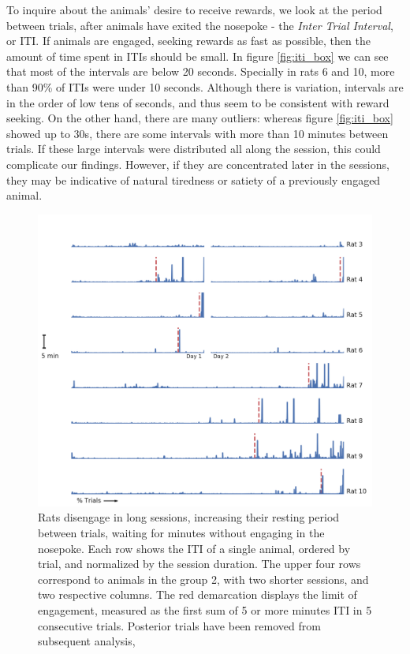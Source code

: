     To inquire about the animals' desire to receive rewards, we look at the period between trials, after animals have exited the nosepoke - the \textit{Inter Trial Interval}, or ITI. If animals are engaged, seeking rewards as fast as possible, then the amount of time spent in ITIs should be small. In figure \ref{fig:iti_box} we can see that most of the intervals are below 20 seconds. Specially in rats 6 and 10, more than 90\% of ITIs were under 10 seconds. Although there is variation, intervals are in the order of low tens of seconds, and thus seem to be consistent with reward seeking. On the other hand, there are many outliers: whereas figure \ref{fig:iti_box} showed up to 30s, there are some intervals with more than 10 minutes between trials. If these large intervals were distributed all along the session, this could complicate our findings. However, if they are concentrated later in the sessions, they may be indicative of natural tiredness or satiety of a previously engaged animal.
    
    \begin{figure}[ht!]
        \centering
        \includegraphics[width=\textwidth]{figures/inter_trial_alongtrial.png}
        \caption[Rats disengage in long sessions]{Rats disengage in long sessions, increasing their resting period between trials, waiting for minutes without engaging in the nosepoke. Each row shows the ITI of a single animal, ordered by trial, and normalized by the session duration. The upper four rows correspond to animals in the group 2, with two shorter sessions, and two respective columns. The red demarcation displays the limit of engagement, measured as the first sum of 5 or more minutes ITI in 5 consecutive trials. Posterior trials have been removed from subsequent analysis,}
        \label{fig:iti}
    \end{figure}
    
